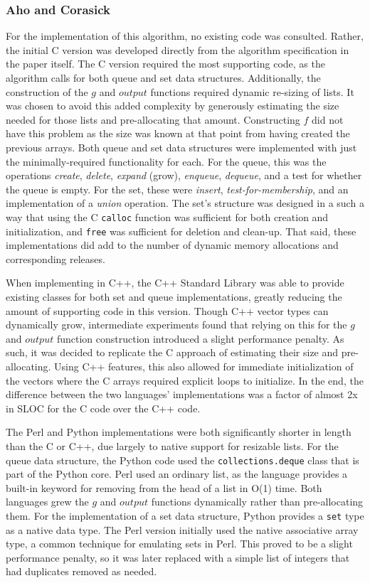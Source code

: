 \subsubsection{Aho and Corasick}

For the implementation of this algorithm, no existing code was consulted. Rather, the initial C version was developed directly from the algorithm specification in the paper itself. The C version required the most supporting code, as the algorithm calls for both queue and set data structures. Additionally, the construction of the $g$ and $output$ functions required dynamic re-sizing of lists. It was chosen to avoid this added complexity by generously estimating the size needed for those lists and pre-allocating that amount. Constructing $f$ did not have this problem as the size was known at that point from having created the previous arrays. Both queue and set data structures were implemented with just the minimally-required functionality for each. For the queue, this was the operations \textit{create}, \textit{delete}, \textit{expand} (grow), \textit{enqueue}, \textit{dequeue}, and a test for whether the queue is empty. For the set, these were \textit{insert}, \textit{test-for-membership}, and an implementation of a \textit{union} operation. The set's structure was designed in a such a way that using the C \texttt{calloc} function was sufficient for both creation and initialization, and \texttt{free} was sufficient for deletion and clean-up. That said, these implementations did add to the number of dynamic memory allocations and corresponding releases.

When implementing in C++, the C++ Standard Library was able to provide existing classes for both set and queue implementations, greatly reducing the amount of supporting code in this version. Though C++ vector types can dynamically grow, intermediate experiments found that relying on this for the $g$ and $output$ function construction introduced a slight performance penalty. As such, it was decided to replicate the C approach of estimating their size and pre-allocating. Using C++ features, this also allowed for immediate initialization of the vectors where the C arrays required explicit loops to initialize. In the end, the difference between the two languages' implementations was a factor of almost 2x in SLOC for the C code over the C++ code.

The Perl and Python implementations were both significantly shorter in length than the C or C++, due largely to native support for resizable lists. For the queue data structure, the Python code used the \texttt{collections.deque} class that is part of the Python core. Perl used an ordinary list, as the language provides a built-in keyword for removing from the head of a list in O(1) time. Both languages grew the $g$ and $output$ functions dynamically rather than pre-allocating them. For the implementation of a set data structure, Python provides a \texttt{set} type as a native data type. The Perl version initially used the native associative array type, a common technique for emulating sets in Perl. This proved to be a slight performance penalty, so it was later replaced with a simple list of integers that had duplicates removed as needed.

